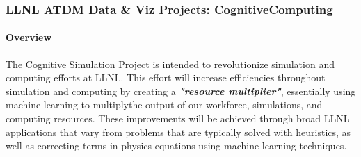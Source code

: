 \subsubsection{LLNL ATDM Data \& Viz Projects: CognitiveComputing}


\paragraph{Overview} 

The Cognitive Simulation Project is intended to revolutionize simulation and computing efforts at LLNL.  
This effort will increase efficiencies throughout simulation and computing by creating a 
\textbf{\textit{"resource multiplier"}}, essentially using machine learning to multiplythe output of our workforce, 
simulations, and computing resources. These improvements will be achieved through broad LLNL applications that 
vary from problems that are typically solved with heuristics, as well as correcting terms in physics equations 
using machine learning techniques.


